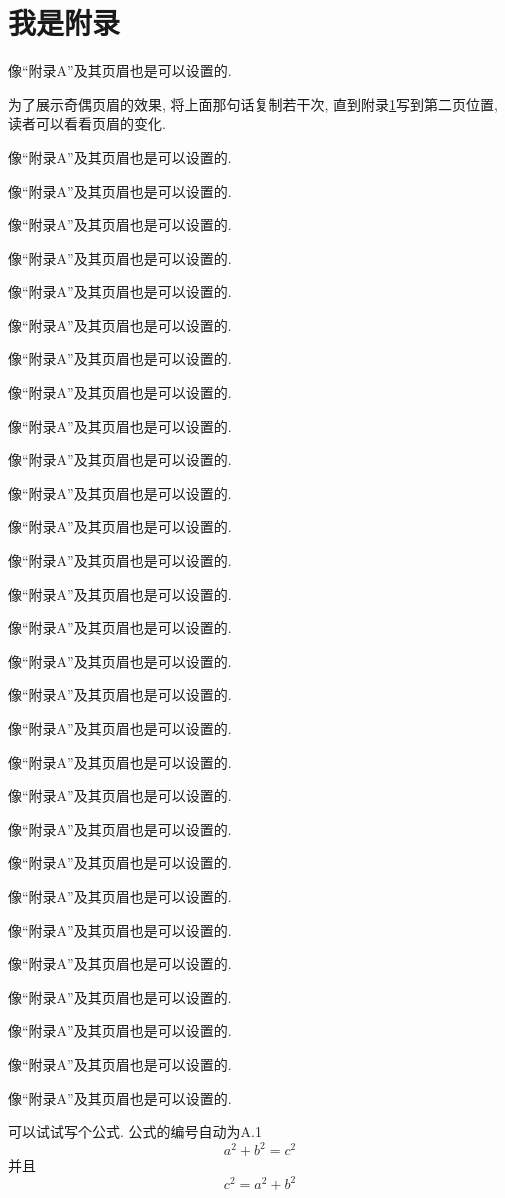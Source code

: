 \section{我是附录}
\label{sec:A}
像``附录A''及其页眉也是可以设置的.

为了展示奇偶页眉的效果, 将上面那句话复制若干次, 直到附录\ref{sec:A}写到第二页位置, 读者可以看看页眉的变化.

像``附录A''及其页眉也是可以设置的.

像``附录A''及其页眉也是可以设置的.

像``附录A''及其页眉也是可以设置的.

像``附录A''及其页眉也是可以设置的.

像``附录A''及其页眉也是可以设置的.

像``附录A''及其页眉也是可以设置的.

像``附录A''及其页眉也是可以设置的.

像``附录A''及其页眉也是可以设置的.

像``附录A''及其页眉也是可以设置的.

像``附录A''及其页眉也是可以设置的.

像``附录A''及其页眉也是可以设置的.

像``附录A''及其页眉也是可以设置的.

像``附录A''及其页眉也是可以设置的.

像``附录A''及其页眉也是可以设置的.

像``附录A''及其页眉也是可以设置的.

像``附录A''及其页眉也是可以设置的.

像``附录A''及其页眉也是可以设置的.

像``附录A''及其页眉也是可以设置的.

像``附录A''及其页眉也是可以设置的.

像``附录A''及其页眉也是可以设置的.

像``附录A''及其页眉也是可以设置的.

像``附录A''及其页眉也是可以设置的.

像``附录A''及其页眉也是可以设置的.

像``附录A''及其页眉也是可以设置的.

像``附录A''及其页眉也是可以设置的.

像``附录A''及其页眉也是可以设置的.

像``附录A''及其页眉也是可以设置的.

像``附录A''及其页眉也是可以设置的.

像``附录A''及其页眉也是可以设置的.

可以试试写个公式. 公式的编号自动为A.1
\begin{equation}\label{equ:A:1}
a^2+b^2=c^2
\end{equation}
并且
\begin{equation}\label{equ:A:2}
c^2=a^2+b^2
\end{equation}

\pagebreak[4]
